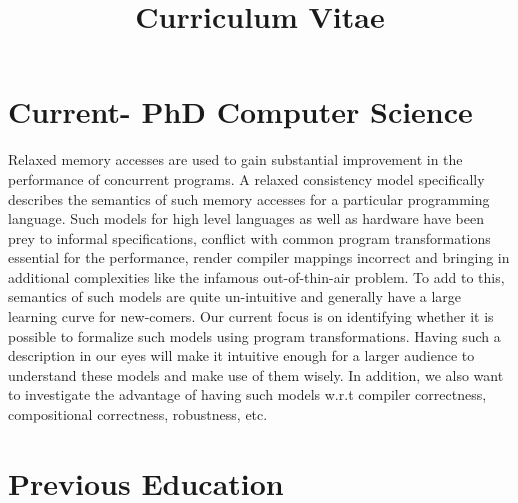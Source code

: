 \documentclass[11pt,a4paper,sans]{moderncv} %
\title{Curriculum Vitae}
\begin{document}

\makecvtitle %


\section{Current- PhD Computer Science}

    Relaxed memory accesses are used to gain substantial improvement in the performance of concurrent programs. 
    A relaxed consistency model specifically describes the semantics of such memory accesses for a particular programming language. 
    Such models for high level languages as well as hardware have been prey to informal specifications, conflict with common program transformations essential for the performance, render compiler mappings incorrect and bringing in additional complexities like the infamous out-of-thin-air problem. 
    To add to this, semantics of such models are quite un-intuitive and generally have a large learning curve for new-comers.
    Our current focus is on identifying whether it is possible to formalize such models using program transformations. 
    Having such a description in our eyes will make it intuitive enough for a larger audience to understand these models and make use of them wisely. 
    In addition, we also want to investigate the advantage of having such models w.r.t compiler correctness, compositional  correctness, robustness, etc.





\section{Previous Education}
\end{document}
